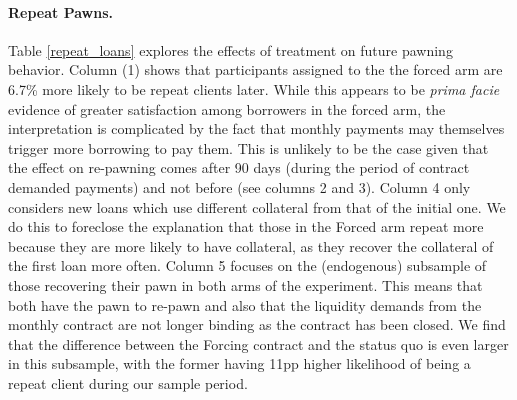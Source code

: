 \documentclass[oneside,11pt]{article}
\begin{document}
\paragraph{Repeat Pawns.}
Table \ref{repeat_loans} explores the effects of treatment on future pawning behavior.
Column (1) shows that participants assigned to the the forced arm are 6.7\% more likely to be repeat clients later. %
While this appears to be \emph{prima facie} evidence of greater satisfaction among borrowers in the forced arm, the interpretation is complicated by the fact that monthly payments may themselves trigger more borrowing to pay them. This is unlikely to be the case given that the effect on re-pawning comes after 90 days (during the period of contract demanded payments) and not before  (see columns 2 and 3). Column 4 only considers new loans which use different collateral from that of the initial one. We do this to foreclose the explanation that those in the Forced arm repeat more because they are more likely to have collateral, as they recover the collateral of the first loan more often.  Column 5 focuses on the (endogenous) subsample of those recovering their pawn in both arms of the experiment. This means that both have the pawn to re-pawn and also that the liquidity demands from the monthly contract are not longer binding as the contract has been closed. We find that the difference between the Forcing contract and the status quo is even larger in this subsample, with the former having 11pp higher likelihood of being a repeat client during our sample period.
\end{document}
